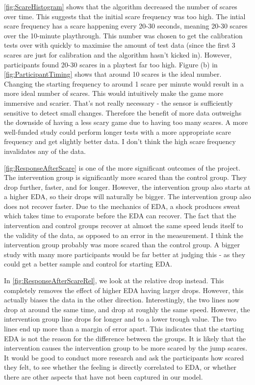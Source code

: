 \documentclass[12pt,a4paper]{article}\usepackage[]{graphicx}\usepackage[]{color}
\begin{document}
\vref{fig:ScareHistogram} shows that the algorithm decreased the number of scares over time.
This suggests that the initial scare frequency was too high.
The intial scare frequency has a scare happening every 20-30 seconds, meaning 20-30 scares over the 10-minute playthrough.
This number was chosen to get the calibration tests over with quickly to maximise the amount of test data (since the first 3 scares are just for calibration and the algorithm hasn't kicked in).
However, participants found 20-30 scares in a playtest far too high.
Figure (b) in \cref{fig:ParticipantTiming} shows that around 10 scares is the ideal number.
Changing the starting frequency to around 1 scare per minute would result in a more ideal number of scares.
This would intuitively make the game more immersive and scarier.
That's not really necessary - the sensor is sufficiently sensitive to detect small changes.
Therefore the benefit of more data outweighs the downside of having a less scary game due to having too many scares.
A more well-funded study could perform longer tests with a more appropriate scare frequency and get slightly better data.
I don't think the high scare frequency invalidates any of the data.

\vref{fig:ResponseAfterScare} is one of the more significant outcomes of the project.
The intervention group is significantly more scared than the control group.
They drop further, faster, and for longer.
However, the intervention group also starts at a higher EDA, so their drops will naturally be bigger.
The intervention group also does not recover faster.
Due to the mechanics of EDA, a shock produces sweat which takes time to evaporate before the EDA can recover.
The fact that the intervention and control groups recover at almost the same speed lends itself to the validity of the data, as opposed to an error in the measurement.
I think the intervention group probably was more scared than the control group.
A bigger study with many more participants would be far better at judging this - as they could get a better sample and control for starting EDA.

In \vref{fig:ResponseAfterScareRel}, we look at the relative drop instead.
This completely removes the effect of higher EDA having larger drops.
However, this actually biases the data in the other direction.
Interestingly, the two lines now drop at around the same time, and drop at roughly the same speed.
However, the intervention group line drops for longer and to a lower trough value.
The two lines end up more than a margin of error apart.
This indicates that the starting EDA is not the reason for the difference between the groups.
It is likely that the intervention causes the intervention group to be more scared by the jump scares.
It would be good to conduct more research and ask the participants how scared they felt, to see whether the feeling is directly correlated to EDA, or whether there are other aspects that have not been captured in our model.
\end{document}
